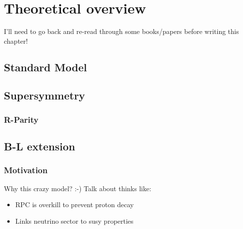 \chapter[Theoretical overview][Theory]{Theoretical overview}

{\color{red} I'll need to go back and re-read through some books/papers before
  writing this chapter!}

\section{Standard Model}

\section{Supersymmetry}

\subsection{R-Parity}

\section{B-L extension}

\subsection{Motivation}

{\color{red} Why this crazy model? :-) Talk about thinks like:
\begin{itemize}
\item RPC is overkill to prevent proton decay
\item Links neutrino sector to susy properties
\end{itemize}
}

